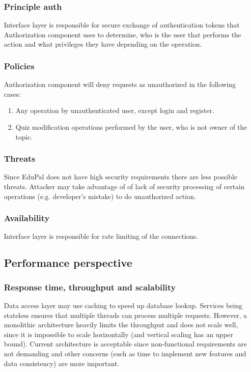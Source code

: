\subsubsection{Principle auth}

Interface layer is responsible for secure exchange of authentication tokens that Authorization component uses to determine, who is the user that performs the action and what privileges they have depending on the operation.

\subsubsection{Policies}

Authorization component will deny requests as unauthorized in the following cases:

\begin{enumerate}
  \item Any operation by unauthenticated user, except login and register.
  \item Quiz modification operations performed by the user, who is not owner of the topic.
\end{enumerate}

\subsubsection{Threats}

Since EduPal does not have high security requirements there are less possible threats. Attacker may take advantage of of lack of security processing of certain operations (e.g. developer's mistake) to do unauthorized action.

\subsubsection{Availability}

Interface layer is responsible for rate limiting of the connections.

\subsection{Performance perspective}

\subsubsection{Response time, throughput and scalability}

Data access layer may use caching to speed up database lookup. Services being stateless ensures that multiple threads can process multiple requests. However, a monolithic architecture heavily limits the throughput and does not scale well, since it is impossible to scale horizontally (and vertical scaling has an upper bound). Current architecture is acceptable since non-functional requirements are not demanding and other concerns (such as time to implement new features and data consistency) are more important.

